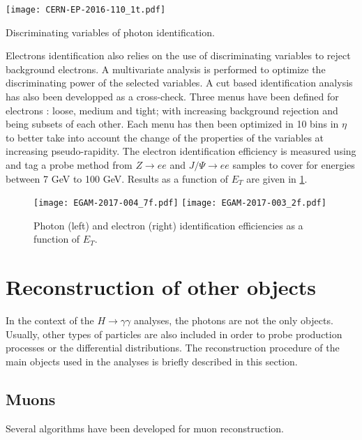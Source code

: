 \begin{table}
  \centering
  \texttt{[image: CERN-EP-2016-110\_1t.pdf]}
  \caption{Discriminating variables of photon identification.\cite{CERN-EP-2016-110}}
  \label{tab:Calibration_RecoID_DVPhotonID}
\end{table}


Electrons identification also relies on the use of discriminating variables to reject background electrons.
A multivariate analysis is performed \cite{ATLAS-CONF-2014-032,CERN-EP-2016-262,EGAM-2017-003} to optimize the discriminating power of the selected variables.
A cut based identification analysis has also been developped as a cross-check.
Three menus have been defined for electrons : loose, medium and tight; with increasing background rejection and being subsets of each other.
Each menu has then been optimized in 10 bins in $\eta$ to better take into account the change of the properties of the variables at increasing pseudo-rapidity.
The electron identification efficiency is measured using and tag a probe method from $Z\rightarrow ee$ and $J/\Psi\rightarrow ee$ samples to cover for energies between 7 GeV to 100 GeV.
Results as a function of \(E_T\) are given in \ref{fig:Calibration_RecoID_ElYEfficiency}.


\begin{figure}
  \centering
  \texttt{[image: EGAM-2017-004\_7f.pdf]}
  \texttt{[image: EGAM-2017-003\_2f.pdf]}
  \caption{Photon (left) and electron (right) identification efficiencies as a function of $E_T$.\cite{EGAM-2017-003}}
  \label{fig:Calibration_RecoID_ElYEfficiency}
\end{figure}

\section{Reconstruction of other objects}
In the context of the $H\rightarrow\gamma\gamma$ analyses, the photons are not the only objects.
Usually, other types of particles are also included in order to probe production processes or the differential distributions.
The reconstruction procedure of the main objects used in the analyses is briefly described in this section.


\subsection{Muons}
\label{sec:orga233caf}

Several algorithms have been developed for muon reconstruction.

